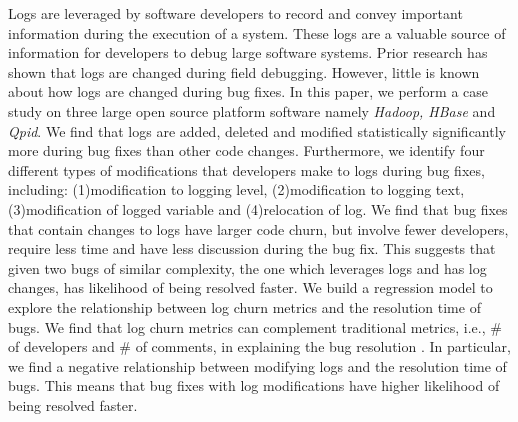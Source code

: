 Logs are leveraged by software developers to record and convey important information during the execution of a system. These logs are a valuable source of information for developers to debug large software systems. Prior research has shown that logs are changed during field debugging. However, little is known about how logs are changed during bug fixes. In this paper, we perform a  case study on three large open source platform software namely \emph{ Hadoop, HBase} and \emph{Qpid}. We find that logs are added, deleted and modified statistically significantly more during bug fixes than other code changes. Furthermore, we identify four different types of modifications that developers make to logs during bug fixes, including: (1)modification to logging level, (2)modification to logging text, (3)modification of logged variable and (4)relocation of log. We find that bug fixes that contain changes to logs have larger code churn, but involve fewer developers, require less time and have less discussion during the bug fix. This suggests that given two bugs of similar complexity, the one which leverages logs and has log changes, has likelihood of being resolved faster.  We build a regression model to explore the relationship between log churn metrics and the resolution time of bugs. We find that log churn metrics can complement traditional metrics, i.e., \# of developers and \# of comments, in explaining the bug resolution . In particular, we find a negative relationship between modifying logs and the resolution time of bugs. This means that bug fixes with log modifications have higher likelihood of being resolved faster.
